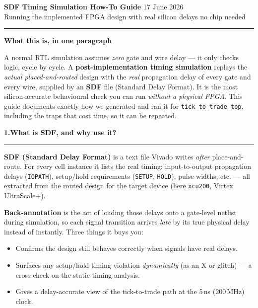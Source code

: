 \documentclass[10pt,a4paper]{article}
\newcommand{\sectionrule}{\par\nobreak\vspace{1pt}\textcolor{rulegray}{\rule{\linewidth}{0.8pt}}\par\vspace{1pt}}
\newcommand{\fpath}[1]{\texttt{\textcolor{hdrblue}{#1}}}
\begin{document}
{\LARGE\bfseries\color{hdrblue} SDF Timing Simulation \textendash{} How-To Guide}%
\hfill{\small\color{rulegray} 17 June 2026}\\[-2pt]
{\large\color{accentteal} Running the implemented FPGA design with real silicon delays \textendash{} no chip needed}

\textcolor{hdrblue}{\rule{\linewidth}{2pt}}

\begin{keybox}
{\large\bfseries\color{newtext} What this is, in one paragraph}

\smallskip
A normal RTL simulation assumes \emph{zero} gate and wire delay --- it only checks
logic, cycle by cycle. A \textbf{post-implementation timing simulation} replays the
\emph{actual placed-and-routed} design with the \emph{real} propagation delay of
every gate and every wire, supplied by an \textbf{SDF} file (Standard Delay
Format). It is the most silicon-accurate behavioural check you can run
\emph{without a physical FPGA}. This guide documents exactly how we generated and
ran it for \fpath{tick\_to\_trade\_top}, including the traps that cost time, so it
can be repeated.
\end{keybox}

{\large\bfseries\color{hdrblue} 1.\quad What is SDF, and why use it?}
\sectionrule

\textbf{SDF (Standard Delay Format)} is a text file Vivado writes \emph{after}
place-and-route. For every cell instance it lists the real timing: input-to-output
propagation delays (\texttt{IOPATH}), setup/hold requirements (\texttt{SETUP},
\texttt{HOLD}), pulse widths, etc. --- all extracted from the routed design for the
target device (here \texttt{xcu200}, Virtex UltraScale+).

\textbf{Back-annotation} is the act of loading those delays onto a gate-level
netlist during simulation, so each signal transition arrives \emph{late} by its
true physical delay instead of instantly. Three things it buys you:

\begin{itemize}[leftmargin=1.4em, topsep=2pt, itemsep=1pt]
\item Confirms the design still behaves correctly when signals have real delays.
\item Surfaces any setup/hold timing violation \emph{dynamically} (as an X or
      glitch) --- a cross-check on the static timing analysis.
\item Gives a delay-accurate view of the tick-to-trade path at the 5\,ns
      (200\,MHz) clock.
\end{itemize}
\end{document}
